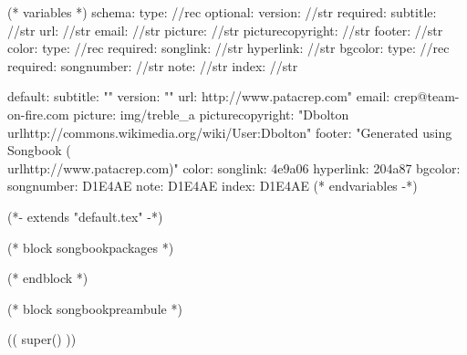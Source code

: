 
(* variables *)
schema:
  type: //rec
  optional:
    version: //str
  required:
    subtitle: //str
    url: //str
    email: //str
    picture: //str
    picturecopyright: //str
    footer: //str
    color:
      type: //rec
      required:
        songlink: //str
        hyperlink: //str
    bgcolor:
      type: //rec
      required:
        songnumber: //str
        note: //str
        index: //str

default:
  subtitle: ""
  version: ""
  url: http://www.patacrep.com"
  email: crep@team-on-fire.com
  picture: img/treble_a
  picturecopyright: "Dbolton \\url{http://commons.wikimedia.org/wiki/User:Dbolton}"
  footer: "Generated using Songbook (\\url{http://www.patacrep.com})"
  color:
    songlink: 4e9a06
    hyperlink: 204a87
  bgcolor:
    songnumber: D1E4AE
    note: D1E4AE
    index: D1E4AE
(* endvariables -*)

(*- extends "default.tex" -*)

(* block songbookpackages *)
\usepackage[
    (* for option in _bookoptions *)((option)),
    (* endfor *)
    ]{crepbook}
(* endblock *)

(* block songbookpreambule *)
\usepackage[
     a4paper %
     ,includeheadfoot %
     ,hmarginratio=1:1 %
     ,outer=1.8cm %
     ,vmarginratio=1:1 %
     ,bmargin=1.3cm %
     ]{geometry}

(( super() ))

